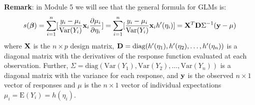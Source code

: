 \documentclass[
  ignorenonframetext,
]{beamer}
\begin{document}
\begin{frame}
\textbf{Remark}: in Module 5 we will see that the general formula for
GLMs is: \[s(\boldsymbol{\beta})=\sum_{i=1}^n
[\frac{y_i-\mu_i}{\text{Var}(Y_i)}{\bf x}_i \frac{\partial \mu_i}{\partial \eta_i}]=\sum_{i=1}^n
[\frac{y_i-\mu_i}{\text{Var}(Y_i)}{\bf x}_i h'(\eta_i)]={\bf X}^T {\bf D} \Sigma^{-1} ({\bf y} -\mu)\]
where \({\bf X}\) is the \(n\times p\) design matrix,
\({\bf D}=\text{diag}(h'(\eta_1),h'(\eta_2),\ldots,h'(\eta_n))\) is a
diagonal matrix with the derivatives of the response function evaluated
at each observation. Further,
\(\Sigma=\text{diag}(\text{Var}(Y_1),\text{Var}(Y_2),\ldots,\text{Var}(Y_n))\)
is a diagonal matrix with the variance for each response, and
\({\bf y}\) is the observed \(n\times 1\) vector of responses and
\(\mu\) is the \(n\times 1\) vector of individual expectations
\(\mu_i=\text{E}(Y_i)=h(\eta_i)\).
\end{frame}

\begin{frame}
\end{frame}
\end{document}
